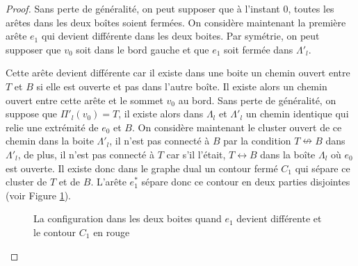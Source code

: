 \documentclass[titlepage,a4paper,11pt]{article}
\newcounter{cor}
\newcommand{\connect}{\leftrightarrow}
\newcommand{\nconnect}{\nleftrightarrow}
\begin{document}
\begin{proof}
Sans perte de généralité, on peut supposer que à l'instant 0, toutes les arêtes dans les deux boîtes soient fermées. On considère maintenant la première arête $e_1$ qui devient différente dans les deux boites. Par symétrie, on peut supposer que $v_0$ soit dans le bord gauche et que $e_1$ soit fermée dans $\Lambda'_l$.

Cette arête devient différente car il existe dans une boite un chemin ouvert entre $T$ et $B$ si elle est ouverte et pas dans l'autre boîte. Il existe alors un chemin ouvert entre cette arête et le sommet $v_0$ au bord. Sans perte de généralité, on suppose que $\Pi'_l(v_0)=T$, il existe alors dans $\Lambda_l$ et $\Lambda'_l$ un chemin identique qui relie une extrémité de $e_0$ et $B$. On considère maintenant le cluster ouvert de ce chemin dans la boite $\Lambda'_l$, il n'est pas connecté à $B$ par la condition $T\nconnect B$ dans $\Lambda'_l$, de plus, il n'est pas connecté à $T$ car s'il l'était, $T\connect B$ dans la boîte $\Lambda_l$ où $e_0$ est ouverte. Il existe donc dans le graphe dual un contour fermé $C_1$ qui sépare ce cluster de $T$ et de $B$. L'arête $e^*_1$ sépare donc ce contour en deux parties disjointes (voir Figure \ref{fig:e1}). 
\begin{figure}[h]
\begin{minipage}{0.45\linewidth}
\center
{}
\end{minipage}
\begin{minipage}{0.45\linewidth}
\center
{}
\end{minipage}
\caption{La configuration dans les deux boites quand $e_1$ devient différente et le contour $C_1$ en rouge}
\label{fig:e1}
\end{figure}


\end{proof}
\end{document}
